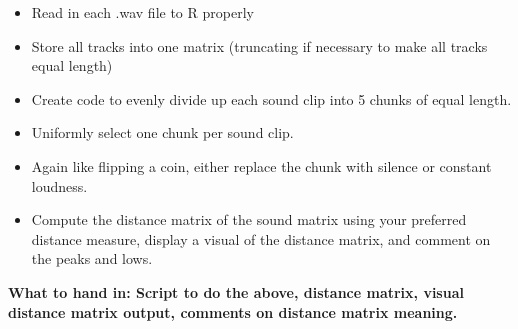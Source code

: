 \documentclass[a4paper]{article}
\begin{document}
\begin{itemize}
\item Read in each .wav file to R properly
\item Store all tracks into one matrix (truncating if necessary to make all tracks equal length)
\item Create code to evenly divide up each sound clip into 5 chunks of equal length.
\item Uniformly select one chunk per sound clip.
\item Again like flipping a coin, either replace the chunk with silence or constant loudness.
\item Compute the distance matrix of the sound matrix using your preferred distance measure, display a visual of the distance matrix, and comment on the peaks and lows.
\end{itemize}

\textbf{What to hand in: Script to do the above, distance matrix, visual distance matrix output, comments on distance matrix meaning.}
\end{document}
